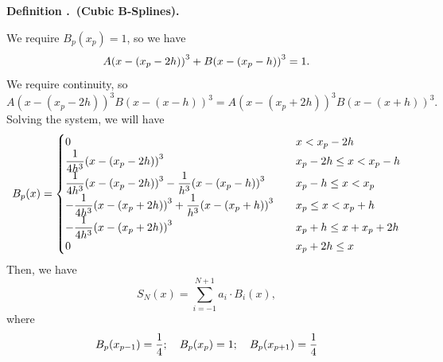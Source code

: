 \documentclass[12pt, a4paper]{article}
\newcounter{index}[subsection]
\newenvironment*{df}[1]{\par\noindent\textbf{Definition \thesubsection.\stepcounter{index}\theindex\ (#1).}}{\par}
\begin{document}
\begin{df}{Cubic B-Splines}
\begin{center}
	\end{center}
	We require $B_p(x_p)=1$, so we have \[A\qty(x-\qty(x_p-2h))^3+B\qty(x-\qty(x_p-h))^3=1.\] We require continuity, so \[A( x-( x_{p} -2h))^{3} B( x-( x-h))^{3}=A( x-( x_{p} +2h))^{3} B( x-( x+h))^{3}.\] Solving the system, we will have \[B_p(x)=\begin{cases}0&\quad x<x_p-2h\\\dfrac{1}{4h^3}\qty(x-\qty(x_p-2h))^3&\quad x_p-2h\le x<x_p-h\\\dfrac{1}{4h^3}\qty(x-(x_p-2h))^3-\dfrac{1}{h^3}\qty(x-(x_p-h))^3&\quad x_p-h\le x<x_p\\-\dfrac{1}{4h^3}\qty(x-(x_p+2h))^3+\dfrac{1}{h^3}\qty(x-(x_p+h))^3&\quad x_p\le x<x_p+h\\-\dfrac{1}{4h^3}\qty(x-(x_p+2h))^3&\quad x_p+h\le x+x_p+2h\\0&\quad x_p+2h\le x\end{cases}\] Then, we have \[S_N(x)=\sum_{i=-1}^{N+1}a_i\cdot B_i(x),\] where \[B_p\qty(x_{p-1})=\dfrac{1}{4};\quad B_p(x_p)=1;\quad B_p\qty(x_{p+1})=\dfrac{1}{4}\]
\end{df}
\end{document}
